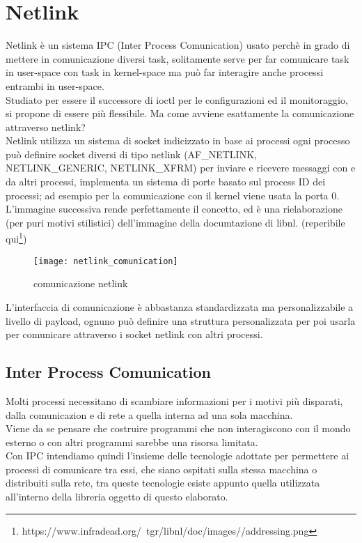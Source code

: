 \section{Netlink}
Netlink \`e un sistema IPC (Inter Process Comunication) usato perch\`e in grado di mettere in comunicazione diversi task, solitamente serve per far comunicare task in user-space con task in kernel-space ma pu\`o far interagire anche processi entrambi in user-space.\\
Studiato per essere il successore di ioctl per le configurazioni ed il monitoraggio, si propone di essere pi\`u flessibile.
Ma come avviene esattamente la comunicazione attraverso netlink?\\
Netlink utilizza un sistema di socket indicizzato in base ai processi ogni processo pu\`o definire socket diversi di tipo netlink (AF\_NETLINK, NETLINK\_GENERIC, NETLINK\_XFRM) per inviare e ricevere messaggi con e da altri processi, implementa un sistema di porte basato sul process ID dei processi; ad esempio per la comunicazione con il kernel viene usata la porta 0.\\
L'immagine successiva rende perfettamente il concetto, ed \`e una rielaborazione (per puri motivi stilistici) dell'immagine della documtazione di libnl. (reperibile qui\footnote{https://www.infradead.org/~tgr/libnl/doc/images//addressing.png})
\begin{figure}[h]                       %
\begin{center}                          %
\texttt{[image: netlink\_comunication]}%
%
\caption[scambio di messaggi attraverso socket netlink]{comunicazione netlink}
\end{center}
\end{figure}
L'interfaccia di comunicazione \`e abbastanza standardizzata ma personalizzabile a livello di payload, ognuno pu\`o definire una struttura personalizzata per poi usarla per comunicare attraverso i socket netlink con altri processi.
\subsection{Inter Process Comunication}
Molti processi necessitano di scambiare informazioni per i motivi pi\`u disparati, dalla comunicazion e di rete a quella interna ad una sola macchina.\\
Viene da se pensare che costruire programmi che non interagiscono con il mondo esterno o con altri programmi sarebbe una risorsa limitata.\\
Con IPC intendiamo quindi l'insieme delle tecnologie adottate per permettere ai processi di comunicare tra essi, che siano ospitati sulla stessa macchina o distribuiti sulla rete, tra queste tecnologie esiste appunto quella utilizzata all'interno della libreria oggetto di questo elaborato.
